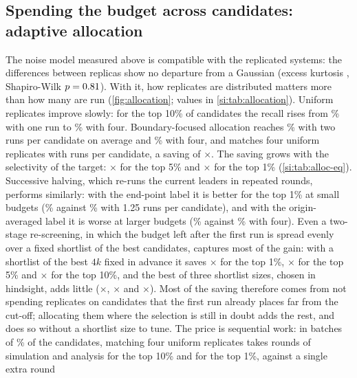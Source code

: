\documentclass[journal=jcisd8,manuscript=article,email=true]{achemso}
\begin{document}
\subsection{Spending the budget across candidates: adaptive allocation}\label{sec:res-allocation}
The noise model measured above is compatible with the replicated systems: the
differences between replicas show no departure from a Gaussian (excess kurtosis \alKurt,
Shapiro-Wilk $p=0.81$).
With it, how replicates are distributed matters more than how many are run (\cref{fig:allocation};
values in \cref{si:tab:allocation}). Uniform replicates improve slowly: for the top 10\% of \alN{} candidates
the recall rises from \alUnifTopTenBOne\% with one run to \alUnifTopTenBFour\% with four.
Boundary-focused allocation reaches \alBoundTopTenBTwo\% with two runs per candidate on average
and \alBoundTopTenBFour\% with four, and matches four uniform replicates with
\alEqTopTenUnifFour{} runs per candidate, a saving of $\times$\alSavingTopTenUnifFour. The saving
grows with the selectivity of the target: $\times$\alSavingTopFiveUnifFour{} for the top 5\% and
$\times$\alSavingTopOneUnifFour{} for the top 1\% (\cref{si:tab:alloc-eq}). Successive halving, which re-runs the current leaders in repeated rounds, performs
similarly: with the end-point label it is better for the top 1\% at small budgets
(\alHalvingTopOneBOneQuarterEnd\% against \alBoundTopOneBOneQuarterEnd\% with 1.25 runs per
candidate), and with the origin-averaged label it is worse at larger budgets
(\alHalvingTopOneBFourAvg\% against \alBoundTopOneBFourAvg\% with four).
Even a two-stage re-screening, in which the budget left after the first run is spread evenly over
a fixed shortlist of the best candidates, captures most of the gain: with a shortlist of the best $4k$ fixed in advance it saves
$\times$\alTwoStageFourkSavingTopOne{} for the top 1\%, $\times$\alTwoStageFourkSavingTopFive{}
for the top 5\% and $\times$\alTwoStageFourkSavingTopTen{} for the top 10\%, and the best of three
shortlist sizes, chosen in hindsight, adds little ($\times$\alTwoStageSavingTopOne,
$\times$\alTwoStageSavingTopFive{} and $\times$\alTwoStageSavingTopTen). Most of the saving therefore comes from not
spending replicates on candidates that the first run already places far from the cut-off;
allocating them where the selection is still in doubt adds the rest, and does so without a
shortlist size to tune. The price is sequential work: in batches of \alBatchPct\% of the
candidates, matching four uniform replicates takes \alRoundsTopTen{} rounds of simulation and
analysis for the top 10\% and \alRoundsTopOne{} for the top 1\%, against a single extra round
\end{document}

